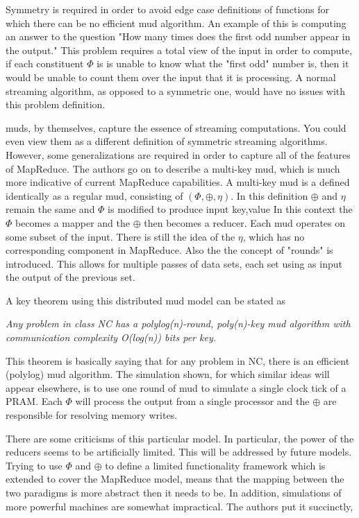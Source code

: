 \documentclass{article}
\begin{document}
Symmetry is required in order to avoid edge case definitions of functions for which there can be no efficient mud algorithm. An example of this is computing an answer to the question "How many times does the first odd number appear in the output." \cite{mud2} This problem requires a total view of the input in order to compute, if each constituent $\Phi$ is is unable to know what the "first odd" number is, then it would be unable to count them over the input that it is processing. A normal streaming algorithm, as opposed to a symmetric one,  would have no issues with this problem definition. 

muds, by themselves, capture the essence of streaming computations. You could even view them as a different definition of symmetric streaming algorithms. However, some generalizations are required in order to capture all of the features of MapReduce. The authors go on to describe a multi-key mud, which is much more indicative of current MapReduce capabilities. A multi-key mud is a defined identically as a regular mud, consisting of $(\Phi, \oplus, \eta)$. In this definition $\oplus$ and $\eta$ remain the same and $\Phi$ is modified to produce input key,value In this context the $\Phi$ becomes a mapper and the $\oplus$ then becomes a reducer. Each mud operates on some subset of the input. There is still the idea of the $\eta$, which has no corresponding component in MapReduce. Also the the concept of "rounds" is introduced. This allows for multiple passes of data sets, each set using as input the output of the previous set. 

A key theorem using this distributed mud model can be stated as

\emph{Any problem in class NC has a polylog(n)-round, poly(n)-key mud algorithm with communication complexity
O(log(n)) bits per key.} 

This theorem is basically saying that for any problem in NC, there is an efficient (polylog) mud algorithm. The simulation shown, for which similar ideas will appear elsewhere, is to use one round of mud to simulate a single clock tick of a PRAM. Each $\Phi$ will process the output from a single processor and the $\oplus$ are responsible for resolving memory writes. 

There are some criticisms of this particular model. In particular, the power of the reducers seems to be artificially limited. This will be addressed by future models. Trying to use $\Phi$ and $\oplus$ to define a limited functionality framework which is extended to cover the MapReduce model, means that the mapping between the two paradigms is more abstract then it needs to be. In addition, simulations of more powerful machines are somewhat impractical. The authors put it succinctly, 
\end{document}
